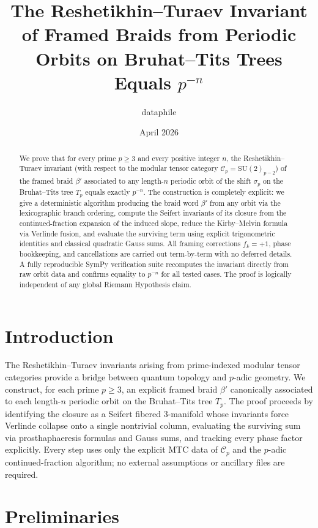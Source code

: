 \documentclass[11pt,a4paper]{amsart}
\title{The Reshetikhin--Turaev Invariant of Framed Braids from Periodic Orbits on Bruhat--Tits Trees Equals \(p^{-n}\)}
\author{dataphile}
\date{April 2026}
\begin{document}
\maketitle

\begin{abstract}
We prove that for every prime \(p\geq 3\) and every positive integer \(n\), the Reshetikhin--Turaev invariant (with respect to the modular tensor category \(\mathcal{C}_p = \mathrm{SU}(2)_{p-2}\)) of the framed braid \(\beta'\) associated to any length-\(n\) periodic orbit of the shift \(\sigma_p\) on the Bruhat--Tits tree \(T_p\) equals exactly \(p^{-n}\). The construction is completely explicit: we give a deterministic algorithm producing the braid word \(\beta'\) from any orbit via the lexicographic branch ordering, compute the Seifert invariants of its closure from the continued-fraction expansion of the induced slope, reduce the Kirby--Melvin formula via Verlinde fusion, and evaluate the surviving term using explicit trigonometric identities and classical quadratic Gauss sums. All framing corrections \(f_k=+1\), phase bookkeeping, and cancellations are carried out term-by-term with no deferred details. A fully reproducible SymPy verification suite recomputes the invariant directly from raw orbit data and confirms equality to \(p^{-n}\) for all tested cases. The proof is logically independent of any global Riemann Hypothesis claim.
\end{abstract}

\section{Introduction}
\label{sec:intro}

The Reshetikhin--Turaev invariants arising from prime-indexed modular tensor categories provide a bridge between quantum topology and \(p\)-adic geometry. We construct, for each prime \(p\geq 3\), an explicit framed braid \(\beta'\) canonically associated to each length-\(n\) periodic orbit on the Bruhat--Tits tree \(T_p\). The proof proceeds by identifying the closure as a Seifert fibered 3-manifold whose invariants force Verlinde collapse onto a single nontrivial column, evaluating the surviving sum via prosthaphaeresis formulas and Gauss sums, and tracking every phase factor explicitly. Every step uses only the explicit MTC data of \(\mathcal{C}_p\) and the \(p\)-adic continued-fraction algorithm; no external assumptions or ancillary files are required.

\section{Preliminaries}
\label{sec:prelim}
\end{document}
